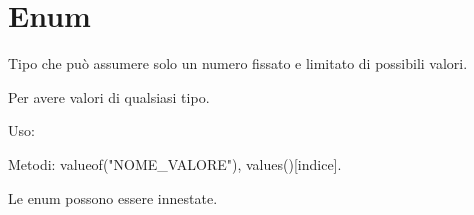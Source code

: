 \section{Enum}
Tipo che può assumere solo un numero fissato e limitato di possibili valori.


Per avere valori di qualsiasi tipo.


Uso: 

Metodi: valueof("NOME\_VALORE"), values()[indice].

Le enum possono essere innestate.